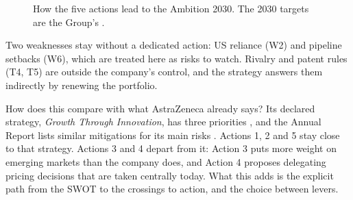 \begin{figure}[H]\centering
{}
\caption{How the five actions lead to the Ambition 2030. The 2030 targets are the Group's \cite[p.~10]{AR}.}
\label{fig:acoes}
\end{figure}
Two weaknesses stay without a dedicated action: US reliance (W2) and pipeline setbacks (W6), which are treated here as risks to watch. Rivalry and patent rules (T4, T5) are outside the company's control, and the strategy answers them indirectly by renewing the portfolio.

How does this compare with what AstraZeneca already says? Its declared strategy, \textit{Growth Through Innovation}, has three priorities \cite[pp.~2, 10, 11]{AR}, and the Annual Report lists similar mitigations for its main risks \cite[p.~48]{AR}. Actions 1, 2 and 5 stay close to that strategy. Actions 3 and 4 depart from it: Action 3 puts more weight on emerging markets than the company does, and Action 4 proposes delegating pricing decisions that are taken centrally today. What this adds is the explicit path from the SWOT to the crossings to action, and the choice between levers.

